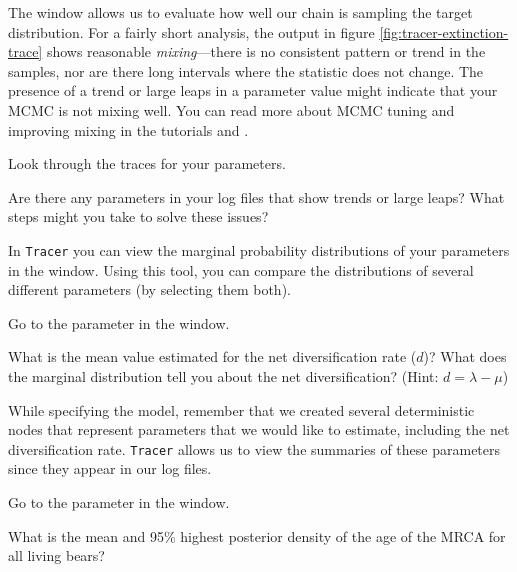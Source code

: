 The  window allows us to evaluate how well our chain is sampling the target distribution.
For a fairly short analysis, the output in figure \ref{fig:tracer-extinction-trace} shows reasonable \textit{mixing}---there is no consistent pattern or trend in the samples, nor are there long intervals where the statistic does not change.
The presence of a trend or large leaps in a parameter value might indicate that your MCMC is not mixing well.
You can read more about MCMC tuning and improving mixing in the tutorials \href{https://github.com/revbayes/revbayes_tutorial/raw/master/tutorial_TeX/RB_MCMC_Intro_Tutorial/RB_MCMC_Intro_Tutorial.pdf}{} and \href{https://github.com/revbayes/revbayes_tutorial/raw/master/tutorial_TeX/RB_MCMC_Tutorial/RB_MCMC_Tutorial.pdf}{}.

\begin{framed}
Look through the traces for your parameters. 

\QUEST Are there any parameters in your log files that show trends or large leaps? What steps might you take to solve these issues?
\end{framed}

In {\tt Tracer} you can view the marginal probability distributions of your parameters in the  window. 
Using this tool, you can compare the distributions of several different parameters (by selecting them both).

\begin{framed}
Go to the  parameter in the  window.

\QUEST What is the mean value estimated for the net diversification rate ($d$)? What does the marginal distribution tell you about the net diversification? (Hint: $d = \lambda - \mu$)
\end{framed}

While specifying the model, remember that we created several deterministic nodes that represent parameters that we would like to estimate, including the net diversification rate. 
{\tt Tracer} allows us to view the summaries of these parameters since they appear in our log files.

\begin{framed}
Go to the  parameter in the  window.

\QUEST What is the mean and 95\% highest posterior density of the age of the MRCA for all living bears? 
\end{framed}


